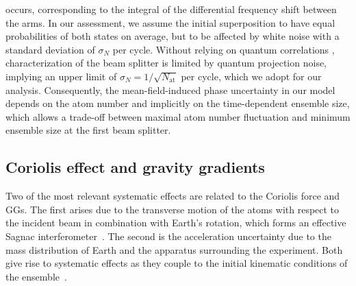 occurs, corresponding to the integral of the differential frequency shift between the arms.
In our assessment, we assume the initial superposition to have equal probabilities of both states on average, but to be affected by white noise with a standard deviation of $\sigma_N$ per cycle.
Without relying on quantum correlations \cite{Brif2020arxiv}, characterization of the beam splitter is limited by quantum projection noise, implying an upper limit of $\sigma_N=1/\sqrt{N_\text{at}}$ per cycle, which we adopt for our analysis.
Consequently, the mean-field-induced phase uncertainty in our model depends on the atom number and implicitly on the time-dependent ensemble size, which allows a trade-off between maximal atom number fluctuation and minimum ensemble size at the first beam splitter.
%
\subsection{Coriolis effect and gravity gradients}
Two of the most relevant systematic effects are related to the Coriolis force and GGs. The first arises due to the transverse motion of the atoms with respect to the incident beam in combination with Earth's rotation, which forms an effective Sagnac interferometer~\cite{Hogan2008,Mueller2009}. The second is the acceleration uncertainty due to the mass distribution of Earth and the apparatus surrounding the experiment. Both give rise to systematic effects as they couple to the initial kinematic conditions of the ensemble~\cite{Antoine2003}.


